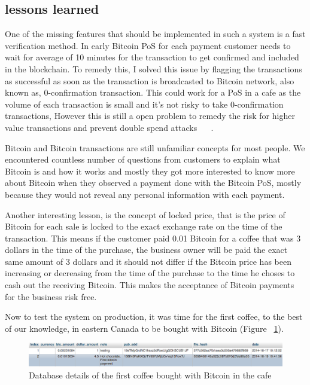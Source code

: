 \subsection{lessons learned}
One of the missing features that should be implemented in such a system is a fast verification method. In early Bitcoin PoS for each payment customer needs to wait for average of 10 minutes for the transaction to get confirmed and included in the blockchain. To remedy this, I solved this issue by flagging the transactions as successful as soon as the transaction is broadcasted to Bitcoin network, also known as, 0-confirmation transaction. This could work for a PoS in a cafe as the volume of each transaction is small and it's not risky to take 0-confirmation transactions, However this is still a open problem to remedy the risk for higher value transactions and prevent double spend attacks ~\cite{karame2012two} ~\cite{bamert2013have}.

Bitcoin and Bitcoin transactions are still unfamiliar concepts for most people. We encountered countless number of questions from customers to explain what Bitcoin is and how it works and mostly they got more interested to know more about Bitcoin when they observed a payment done with the Bitcoin PoS, mostly because they would not reveal any personal information with each payment.

Another interesting lesson, is the concept of locked price, that is the price of Bitcoin for each sale is locked to the exact exchange rate on the time of the transaction. This means if the customer paid 0.01 Bitcoin for a coffee that was 3 dollars in the time of the purchase, the business owner will be paid the exact same amount of 3 dollars and it should not differ if the Bitcoin price has been increasing or decreasing from the time of the purchase to the time he choses to cash out the receiving Bitcoin. This makes the acceptance of Bitcoin payments for the business risk free.

Now to test the system on production, it was time for the first coffee, to the best of our knowledge, in eastern Canada to be bought with Bitcoin (Figure ~\ref{fig:firsttransaction}).

\begin{figure}[htb!p]
\centering
\includegraphics[width=\linewidth]{fig/first_cafe_transaction.png}
  \caption{Database details of the first coffee bought with Bitcoin in the cafe}
\label{fig:firsttransaction}
\end{figure}



